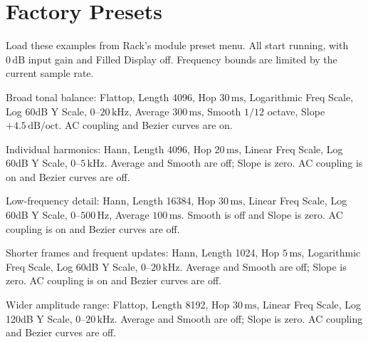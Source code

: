 \section{Factory Presets}\label{sec:presets}

Load these examples from Rack's module preset menu. All start running,
with $0\,\mathrm{dB}$ input gain and Filled Display off. Frequency bounds
are limited by the current sample rate.

\begin{description}[style=nextline, leftmargin=0pt, labelwidth=0pt, labelsep=0pt]
  \item[Mastering] Broad tonal balance: Flattop, Length 4096, Hop
  $30\,\mathrm{ms}$, Logarithmic Freq Scale, Log 60dB Y Scale, $0$--$20\,\mathrm{kHz}$,
  Average $300\,\mathrm{ms}$, Smooth $1/12$ octave, Slope
  $+4.5\,\mathrm{dB/oct}$. AC coupling and Bezier curves are on.
  \item[Harmonics] Individual harmonics: Hann, Length 4096, Hop
  $20\,\mathrm{ms}$, Linear Freq Scale, Log 60dB Y Scale, $0$--$5\,\mathrm{kHz}$.
  Average and Smooth are off; Slope is zero. AC coupling is on and Bezier
  curves are off.
  \item[BassDetail] Low-frequency detail: Hann, Length 16384, Hop
  $30\,\mathrm{ms}$, Linear Freq Scale, Log 60dB Y Scale, $0$--$500\,\mathrm{Hz}$,
  Average $100\,\mathrm{ms}$. Smooth is off and Slope is zero. AC coupling
  is on and Bezier curves are off.
  \item[Transients] Shorter frames and frequent updates: Hann, Length 1024,
  Hop $5\,\mathrm{ms}$, Logarithmic Freq Scale, Log 60dB Y Scale,
  $0$--$20\,\mathrm{kHz}$. Average and Smooth are off; Slope is zero.
  AC coupling is on and Bezier curves are off.
  \item[PluginDevelopment] Wider amplitude range: Flattop, Length 8192,
  Hop $30\,\mathrm{ms}$, Linear Freq Scale, Log 120dB Y Scale,
  $0$--$20\,\mathrm{kHz}$. Average and Smooth are off; Slope is zero.
  AC coupling and Bezier curves are off.
\end{description}
